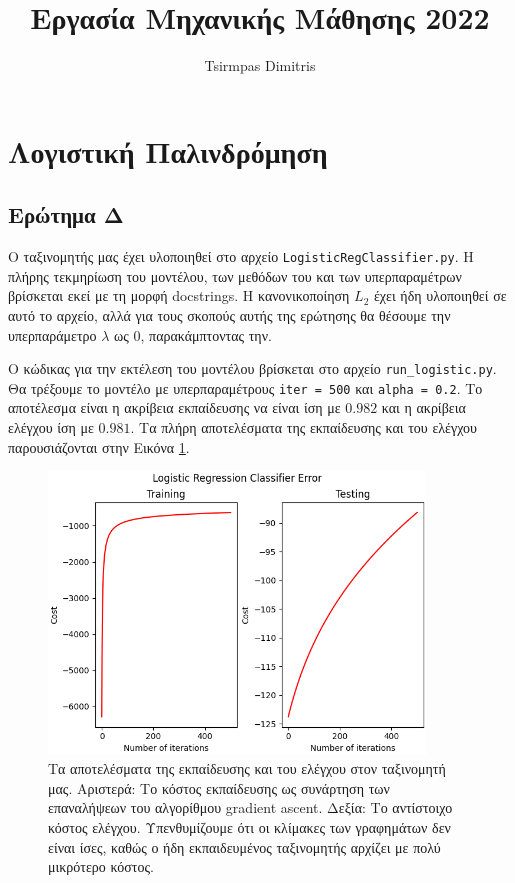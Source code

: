\documentclass{article}
\title{Εργασία Μηχανικής Μάθησης 2022}
\author{Tsirmpas Dimitris}
\newcommand{\code}{\texttt}
\begin{document}
	
\maketitle

\section{Λογιστική Παλινδρόμηση}

\subsection{Ερώτημα Δ}
Ο ταξινομητής μας έχει υλοποιηθεί στο αρχείο \code{LogisticRegClassifier.py}. Η πλήρης τεκμηρίωση του μοντέλου, των μεθόδων του και των υπερπαραμέτρων βρίσκεται εκεί με τη μορφή docstrings. Η κανονικοποίηση $L_{2}$ έχει ήδη υλοποιηθεί σε αυτό το αρχείο, αλλά για τους σκοπούς αυτής της ερώτησης θα θέσουμε την υπερπαράμετρο \code{$\lambda$} ως 0, παρακάμπτοντας την.\par

Ο κώδικας για την εκτέλεση του μοντέλου βρίσκεται στο αρχείο \code{run\_logistic.py}. Θα τρέξουμε το μοντέλο με υπερπαραμέτρους \code{iter = 500} και \code{alpha = 0.2}. Το αποτέλεσμα είναι η ακρίβεια εκπαίδευσης να είναι ίση με $0.982$ και η ακρίβεια ελέγχου ίση με $0.981$. Τα πλήρη αποτελέσματα της εκπαίδευσης και του ελέγχου παρουσιάζονται στην Εικόνα \ref{logistic_train_test}.

\begin{figure}
	\includegraphics[width=10cm]{logistic_error.png}
	\centering
	\caption{Τα αποτελέσματα της εκπαίδευσης και του ελέγχου στον ταξινομητή μας. Αριστερά: Το κόστος εκπαίδευσης ως συνάρτηση των επαναλήψεων του αλγορίθμου gradient ascent. Δεξία: Το αντίστοιχο κόστος ελέγχου. Υπενθυμίζουμε ότι οι κλίμακες των γραφημάτων δεν είναι ίσες, καθώς ο ήδη εκπαιδευμένος ταξινομητής αρχίζει με πολύ μικρότερο κόστος. }
	\label{logistic_train_test}
\end{figure}
\end{document}
